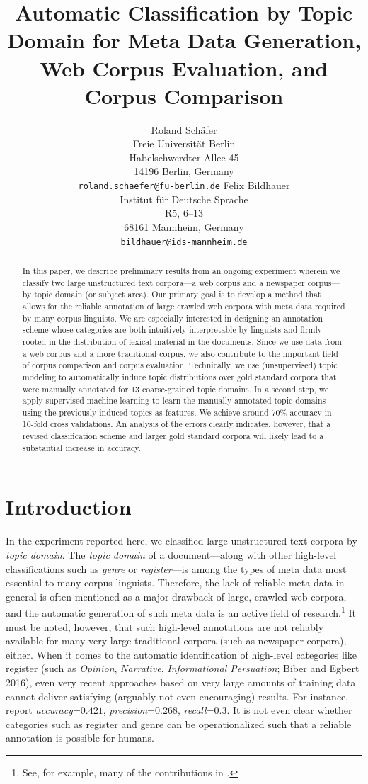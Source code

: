 \documentclass[11pt]{article}
\title{Automatic Classification by Topic Domain for Meta Data Generation, Web Corpus Evaluation, and Corpus Comparison}
\author{Roland Schäfer\\
	    Freie Universität Berlin\\
	    Habelschwerdter Allee 45\\
	    14196 Berlin, Germany\\
	    {\tt roland.schaefer@fu-berlin.de}
	  \And
	Felix Bildhauer\\
  	Institut für Deutsche Sprache\\
  	R5, 6--13\\
  	68161 Mannheim, Germany\\
  {\tt bildhauer@ids-mannheim.de}}
\date{}
\begin{document}
\maketitle

\begin{abstract}
In this paper, we describe preliminary results from an ongoing experiment wherein we classify two large unstructured text corpora---a web corpus and a
newspaper corpus---by topic domain (or subject area).
Our primary goal is to develop a method that allows for the reliable annotation of large crawled web corpora with meta data required by many corpus linguists. We are especially interested in designing an annotation scheme whose categories are both intuitively interpretable by linguists and firmly rooted in the distribution of lexical material in the documents.
Since we use data from a web corpus and a more traditional corpus, we also contribute to the important field of corpus comparison and corpus evaluation.
Technically, we use (unsupervised) topic modeling to automatically induce topic distributions over gold standard corpora that were manually annotated for 13 coarse-grained topic domains.
In a second step, we apply supervised machine learning to learn the manually annotated topic domains using the previously induced topics as features.
We achieve around 70\% accuracy in 10-fold cross validations.
An analysis of the errors clearly indicates, however, that a revised classification scheme and larger gold standard corpora will likely lead to a substantial increase in accuracy.
\end{abstract}

\section{Introduction}
\label{sec:introduction}

In the experiment reported here, we classified large unstructured text corpora by \textit{topic domain}.
The \textit{topic domain} of a document---along with other high-level classifications such as \textit{genre} or \textit{register}---is among the types of meta data most essential to many corpus linguists.
Therefore, the lack of reliable meta data in general is often mentioned as a major drawback of large, crawled web corpora, and the automatic generation of such meta data is an active field of research.\footnote{See, for example, many of the contributions in .}
It must be noted, however, that such high-level annotations are not reliably available for many very large traditional corpora (such as newspaper corpora), either.
When it comes to the automatic identification of high-level categories like register (such as \textit{Opinion}, \textit{Narrative}, \textit{Informational Persuation}; Biber and Egbert 2016), even very recent approaches based on very large amounts of training data cannot deliver satisfying (arguably not even encouraging) results.
For instance,  report \textit{accuracy}=$0.421$, \textit{precision}=$0.268$, \textit{recall}=$0.3$.
It is not even clear whether categories such as register and genre can be operationalized such that a reliable annotation is possible for humans.
\end{document}

